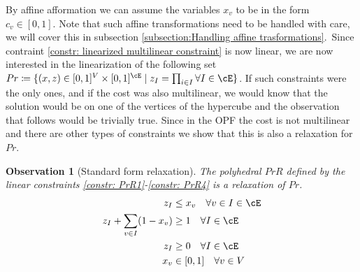 \documentclass{article}
\newcommand{\gr}[2][]{\todo[color=green!20,#1]{\textsf{G:} #2}}
\newtheorem{observation}[theorem]{Observation}
\begin{document}
By affine afformation we can assume the variables \(x_v\) to be in the form \(c_v \in [0,1]\). Note that such affine transformations need to be handled with care, we will cover this in subsection \ref{subsection:Handling affine trasformations}.\
Since contraint \eqref{constr: linearized multilinear constraint} is now linear, we are now interested in the linearization of the following set \(Pr \coloneqq  \{(x,z) \in [0,1]^V \times [0,1]^{\cE} \mid z_I = \prod_{i \in I} \forall I \in \cE\}\).
If such constraints were the only ones, and if the cost was also multilinear, we would know that the solution would be on one of the vertices of the hypercube and the observation that follows would be trivially true. Since in the OPF the cost is not multilinear and there are other types of constraints we show that this is also a relaxation for \(Pr\).
\begin{observation}[Standard form relaxation]\label{obs: standard form relaxation}
  The polyhedral \(PrR\) defined by the linear constraints  \eqref{constr: PrR1}-\eqref{constr: PrR4} is a relaxation of \(Pr\).
  \gr[]{fixalignment}
  \begin{align}
    z_I &\leq x_v   \quad\forall v \in I \in \cE \label{constr: PrR1} \\
    z_I + \sum_{v \in I}(1-x_v) &\geq 1 \quad \forall I \in \cE \label{constr: PrR2}\\
    z_I &\geq 0  \quad\forall I \in \cE \label{constr: PrR3}\\
    x_v &\in [0,1]  \quad \forall v \in V \label{constr: PrR4}
  \end{align}
\end{observation}
\end{document}
